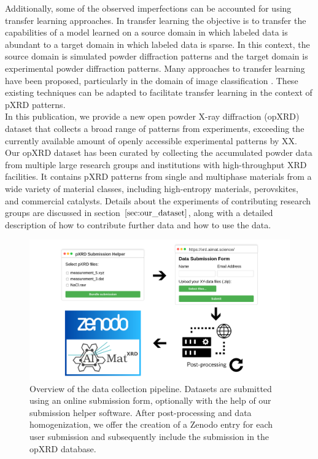 Additionally, some of the observed imperfections can be accounted for using transfer learning approaches. In transfer learning the objective is to transfer the capabilities of a model learned on a source domain in which labeled data is abundant to a target domain in which labeled data is sparse\cite{Zhuang2021}. In this context, the source domain is simulated powder diffraction patterns and the target domain is experimental powder diffraction patterns. Many approaches to transfer learning have been proposed, particularly in the domain of image classification \cite{Gatys2016, Ganin2015}. These existing techniques can be adapted to facilitate transfer learning in the context of pXRD patterns.\\

In this publication, we provide a new open powder X-ray diffraction (opXRD) dataset that collects a broad range of patterns from experiments, exceeding the currently available amount of openly accessible experimental patterns by XX.
Our opXRD dataset has been curated by collecting the accumulated powder data from multiple large research groups and institutions with high-throughput XRD facilities. It contains pXRD patterns from single and multiphase materials from a wide variety of material classes, including 
high-entropy materials, perovskites, and commercial catalysts. Details about the experiments of contributing research groups are discussed in section $\eqref{sec:our_dataset}$, along with a detailed description of how to contribute further data and how to use the data. \\

\begin{figure}[!htb]
    \centering
    \includegraphics[width=\linewidth]{figures/overview.png}
    \caption{Overview of the data collection pipeline. Datasets are submitted using an online submission form, optionally with the help of our submission helper software. After post-processing and data homogenization, we offer the creation of a Zenodo entry for each user submission and subsequently include the submission in the opXRD database.}
    \label{fig:overview}
\end{figure}

